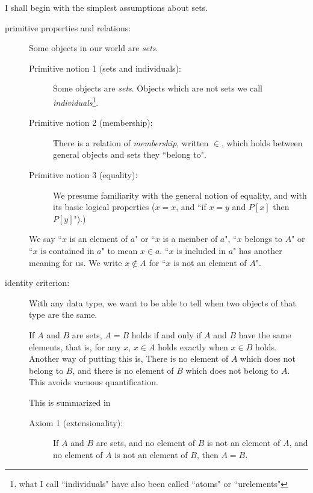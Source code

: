 \documentclass[12pt]{article}
\begin{document}
I shall begin with the simplest assumptions about sets.

\begin{description}

\item[primitive properties and relations:]  Some objects in our world are {\em sets\/}.  

\begin{description}

\item[Primitive notion 1 (sets and individuals):]  Some objects are {\em sets\/}.  Objects which are not sets we call {\em individuals\/}\footnote{what I call ``individuals" have also been called ``atoms" or ``urelements"}.

\item[Primitive notion 2 (membership):]  There is a relation of {\em membership}, written $\in$, which holds between general objects and sets they ``belong to".

\item[Primitive notion 3 (equality):]  We presume familiarity with the general notion of equality, and with its basic logical properties ($x=x$, and ``if $x=y$ and $P[x]$ then $P[y]$").)

\end{description} 

We say ``$x$ is an element of $a$" or ``$x$ is a member of $a$", ``$x$ belongs to $A$" or ``$x$ is contained in $a$" to mean $x \in a$.   ``$x$ is included in $a$" has another meaning for us.  We write $x \not\in A$ for ``$x$ is not an element of $A$".

\item[identity criterion:]  With any data type, we want to be able to tell when two objects of that type are the same.

If $A$ and $B$ are sets, $A=B$ holds if and only if $A$ and $B$ have the same elements, that is, for any $x$, $x \in A$ holds exactly when $x \in B$ holds.   Another way of putting this is, There is no element of $A$ which does not belong to $B$, and there is no element of $B$ which does not belong to $A$.  This avoids vacuous quantification.

This is summarized in

\begin{description}

\item[Axiom 1 (extensionality):]  If $A$ and $B$ are sets, and no element of $B$ is not an element of $A$, and no element of $A$ is not an element of $B$, then $A=B$.


\end{description}
\end{description}
\end{document}
